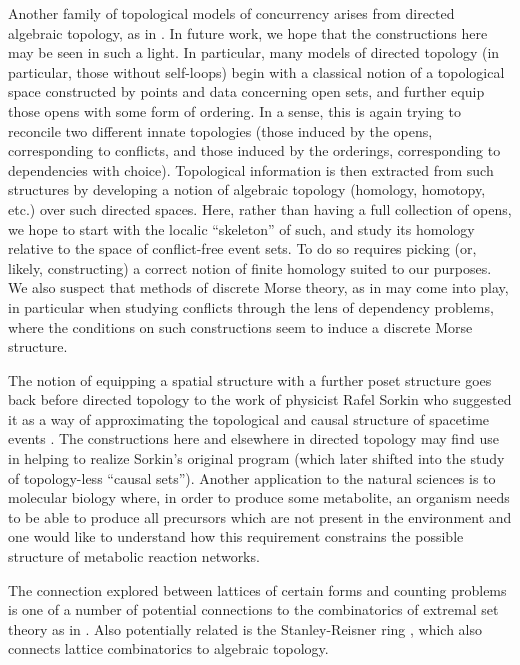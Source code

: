 \documentclass[hoptionsi,review,screen,format=acmsmall]{acmart}
\theoremstyle{definition}
\begin{document}
Another family of topological models of concurrency arises from directed algebraic topology, as in \cite{fajstrup2016directed}. In future work, we hope that the constructions here may be seen in such a light. In particular, many models of directed topology (in particular, those without self-loops) begin with a classical notion of a topological space constructed by points and data concerning open sets, and further equip those opens with some form of ordering. In a sense, this is again trying to reconcile two different innate topologies (those induced by the opens, corresponding to conflicts, and those induced by the orderings, corresponding to dependencies with choice). Topological information is then extracted from such structures by developing a notion of algebraic topology (homology, homotopy, etc.) over such directed spaces. Here, rather than having a full collection of opens, we hope to start with the localic ``skeleton'' of such, and study its homology relative to the space of conflict-free event sets. To do so requires picking (or, likely, constructing) a correct notion of finite homology suited to our purposes. We also suspect that methods of discrete Morse theory, as in \cite{forman2002user} may come into play, in particular when studying conflicts through the lens of dependency problems, where the conditions on such constructions seem to induce a discrete Morse structure.

The notion of equipping a spatial structure with a further poset structure goes back before
directed topology to the work of physicist Rafel Sorkin who suggested it as a way of approximating the
topological and causal structure of spacetime events \cite{sorkin1983posets}.  The constructions here and elsewhere in directed
topology may find use in helping to realize Sorkin’s original program (which later shifted into the study of topology-less ``causal sets'').  Another application to the natural sciences is to molecular biology where, in order to produce some metabolite, an organism needs to be able to produce
all precursors which are not present in the environment and one would like to understand how this requirement
constrains the possible structure of metabolic reaction networks.

The connection explored between lattices of certain forms and counting problems is one of a number of potential connections to the combinatorics of extremal set theory as in \cite{stanley2013algebraic}. Also potentially related is the Stanley-Reisner ring \cite{francisco2014survey}, which also connects lattice combinatorics to algebraic topology.
\end{document}
